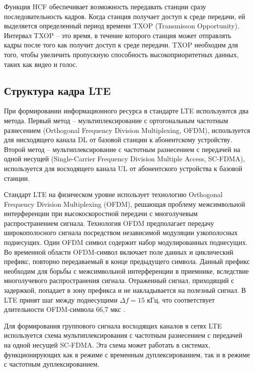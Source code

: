 Функция HCF обеспечивает возможность передавать станции сразу последовательность кадров. Когда станция получает доступ к среде передачи, ей выделяется определенный период времени TXOP (Transmisson Opportunity). Интервал TXOP  -- это время, в течение которого станция может отправлять кадры после того как получит доступ к среде передачи. TXOP необходим для того, чтобы увеличить пропускную способность высокоприоритетных данных, таких как видео и голос.

\subsection{Структура кадра LTE}


При формировании информационного ресурса в стандарте LTE используются два метода. Первый метод -- мультиплексирование с
ортогональным частотным разнесением (Orthogonal Frequency Division Multiplexing, OFDM), используется для нисходящего канала DL от базовой станции к абонентскому устройству. Второй метод -- мультиплексирование с частотным разнесением с передачей на одной несущей (Single-Carrier Frequency Division Multiple Access, SC-FDMA), используется для восходящего канала UL от абонентского устройства к базовой станции. 
 

Стандарт LTE на физическом уровне использует технологию  Orthogonal Frequency Division Multiplexing (OFDM), решающая проблему межсимвольной интерференции при высокоскоростной передачи с многолучевым распространением сигнала. Технология OFDM предполагает передачу широкополосного сигнала посредством независимой модуляции узкополосных поднесущих. Один OFDM символ содержит набор модулированных поднесущих. Во временной области OFDM-символ включает поле данных и циклический префикс, повторно передаваемый в конце предыдущего символа. Данный префикс необходим для борьбы с межсимвольной интерференции в приемнике, вследствие многолучевого распространения сигнала. Отраженный сигнал, приходящий с задержкой, попадает в зону префикса и не накладывается на полезный сигнал. В LTE принят шаг между поднесущими $\Delta f = 15$  кГц, что соответствует длительности OFDM-символа 66,7 мкс \cite{Dahlman2013}.

Для формирования группового сигнала восходящих каналов в сетях LTE используется схема мультиплексирования с частотным разнесением с передачей на одной несущей SC-FDMA. Эта схема может работать в системах, функционирующих как в режиме с временным дуплексированием, так и в режиме с частотным дуплексированием. 

